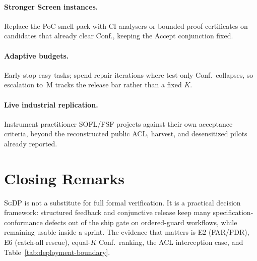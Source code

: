 \paragraph{Stronger Screen instances.}
Replace the PoC smell pack with CI analysers or bounded proof certificates on
candidates that already clear Conf., keeping the Accept conjunction fixed.

\paragraph{Adaptive budgets.}
Early-stop easy tasks; spend repair iterations where test-only Conf.\ collapses,
so escalation to~M tracks the release bar rather than a fixed $K$.

\paragraph{Live industrial replication.}
Instrument practitioner SOFL/FSF projects against their own acceptance
criteria, beyond the reconstructed public ACL, harvest, and desensitized
pilots already reported.


\section{Closing Remarks}
\label{sec:conc:closing}

\textsc{SgDP} is not a substitute for full formal verification.
It is a practical decision framework: structured feedback and conjunctive
release keep many specification-conformance defects out of the ship gate on
ordered-guard workflows, while remaining usable inside a sprint.
The evidence that matters is E2 (FAR/PDR), E6 (catch-all rescue), equal-$K$
Conf.\ ranking, the ACL interception case, and
Table~\ref{tab:deployment-boundary}.
